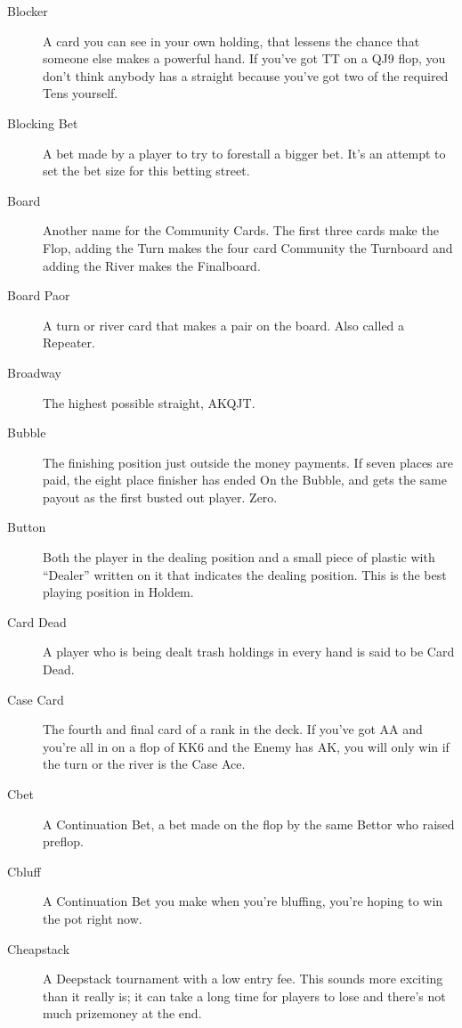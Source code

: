 \begin{description}
\item[Blocker] A card you can see in your own holding, that lessens
the chance that someone else makes a powerful hand. If you've got TT
on a QJ9 flop, you don't think anybody has a straight because you've
got two of the required Tens yourself.

\item[Blocking Bet] A bet made by a player to try to forestall a
bigger bet. It's an attempt to set the bet size for this betting
street.

\item[Board] Another name for the Community Cards. The first three
cards make the Flop, adding the Turn makes the four card Community the
Turnboard and adding the River makes the Finalboard.

\item[Board Paor] A turn or river card that makes a pair on the
board. Also called a Repeater.

\item[Broadway] The highest possible straight, AKQJT.

\item[Bubble] The finishing position just outside the money payments.
If seven places are paid, the eight place finisher has ended On the
Bubble, and gets the same payout as the first busted out player. Zero.

\item[Button] Both the player in the dealing position and a small
piece of plastic with ``Dealer'' written on it that indicates the
dealing position. This is the best playing position in Holdem.

\item[Card Dead] A player who is being dealt trash holdings in every
hand is said to be Card Dead.

\item[Case Card] The fourth and final card of a rank in the deck. If
you've got AA and you're all in on a flop of KK6 and the Enemy has AK,
you will only win if the turn or the river is the Case Ace.

\item[Cbet] A Continuation Bet, a bet made on the flop by the same Bettor
who raised preflop.

\item[Cbluff] A Continuation Bet you make when you're bluffing, you're
hoping to win the pot right now.

\item[Cheapstack] A Deepstack tournament with a low entry fee. This
sounds more exciting than it really is; it can take a long time for
players to lose and there's not much prizemoney at the end.


\end{description}
